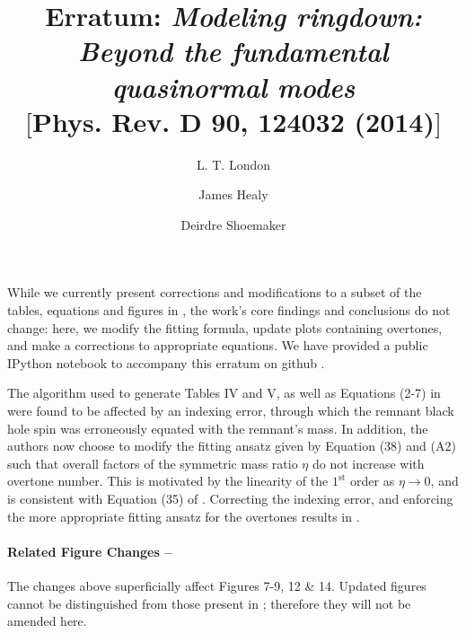 \documentclass[notitlepage,prd,article,floatfix,preprintnumbers,a4paper,nofootinbib,superscriptaddress]{revtex4-1}
\begin{document}

\title{Erratum: \textit{Modeling ringdown: Beyond the fundamental quasinormal modes}\\
$[$Phys. Rev. D 90, 124032 (2014)$]$}

\author{L. T. London}
 \author{James Healy}
 \author{Deirdre Shoemaker}


{\let\newpage\relax\maketitle}

%
\par While we currently present corrections and modifications to a subset of the tables, equations and figures in \cite{London:2014cma}, the work's core findings and conclusions do not change: here, we modify the fitting formula, update plots containing overtones, and make a corrections to appropriate equations.
%
We have provided a public IPython notebook to accompany this erratum on github \cite{London:2016git}.
%
\par The algorithm used to generate Tables IV and V, as well as Equations (2-7) in \cite{London:2014cma} were found to be affected by an indexing error, through which the remnant black hole spin was erroneously equated with the remnant's mass.
%
In addition, the authors now choose to modify the fitting ansatz given by Equation (38) and (A2) such that overall factors of the symmetric mass ratio $\eta$ do not increase with overtone number.
%
This is motivated by the linearity of the $1^{\mathrm{st}}$ order  as $\eta \rightarrow 0$, and is consistent with Equation (35) of \cite{London:2014cma}.
%
Correcting the indexing error, and enforcing the more appropriate fitting ansatz for the overtones results in .
%

%
\paragraph*{Related Figure Changes --} The changes above superficially affect Figures 7-9, 12 \& 14. Updated figures cannot be distinguished from those present in \cite{London:2014cma}; therefore they will not be amended here.
%
\end{document}
